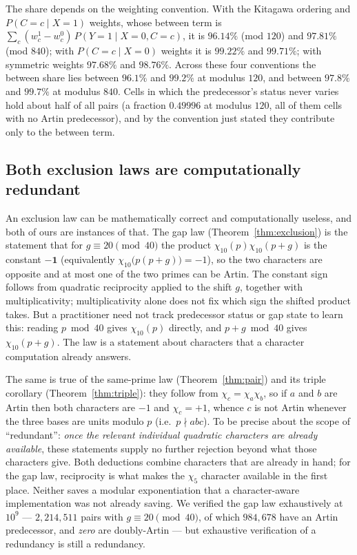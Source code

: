 The share depends on the weighting convention. With the Kitagawa ordering and
$P(C{=}c\mid X{=}1)$ weights, whose between term is
$\sum_c (w_c^1-w_c^0)\,P(Y{=}1\mid X{=}0, C{=}c)$, it is $96.14\%$ (mod $120$) and $97.81\%$
(mod $840$); with $P(C{=}c\mid X{=}0)$ weights it is $99.22\%$ and $99.71\%$; with symmetric
weights $97.68\%$ and $98.76\%$. Across these four conventions the between share lies between
$96.1\%$ and $99.2\%$ at modulus $120$, and between $97.8\%$ and $99.7\%$ at modulus $840$.
Cells in which the predecessor's status never varies hold about half of all pairs (a fraction
$0.49996$ at modulus $120$, all of them cells with no Artin predecessor), and by the convention
just stated they contribute only to the between term.

\subsection*{Both exclusion laws are computationally redundant}
An exclusion law can be mathematically correct and computationally useless, and both of ours are
instances of that. The gap law (Theorem~\ref{thm:exclusion}) is the statement that for
$g \equiv 20 \pmod{40}$ the product $\chi_{10}(p)\chi_{10}(p+g)$ is the constant $\mathbf{-1}$
(equivalently $\chi_{10}\bigl(p(p+g)\bigr) = -1$), so the two characters are opposite and at most
one of the two primes can be Artin. The constant sign follows from quadratic reciprocity applied
to the shift $g$, together with multiplicativity; multiplicativity alone does not fix which sign
the shifted product takes. But a practitioner need not track predecessor status or gap state to
learn this: reading $p \bmod 40$ gives $\chi_{10}(p)$ directly, and $p+g \bmod 40$ gives
$\chi_{10}(p+g)$. The law is a statement about characters that a character computation already
answers.

The same is true of the same-prime law (Theorem~\ref{thm:pair}) and its triple corollary
(Theorem~\ref{thm:triple}): they follow from $\chi_c = \chi_a\chi_b$, so if $a$ and $b$ are Artin
then both characters are $-1$ and $\chi_c = +1$, whence $c$ is not Artin whenever the three bases are units modulo $p$
(i.e.\ $p\nmid abc$). To be precise about the scope of ``redundant'': \emph{once the relevant individual
quadratic characters are already available}, these statements supply no further rejection beyond
what those characters give. Both deductions combine characters that are already in hand; for
the gap law, reciprocity is what makes the $\chi_5$ character available in the first place.
Neither saves a
modular exponentiation that a character-aware implementation was not already saving. We verified
the gap law exhaustively at $10^9$ --- $2{,}214{,}511$ pairs with $g \equiv 20 \pmod{40}$, of
which $984{,}678$ have an Artin predecessor, and \emph{zero} are doubly-Artin --- but exhaustive
verification of a redundancy is still a redundancy.


